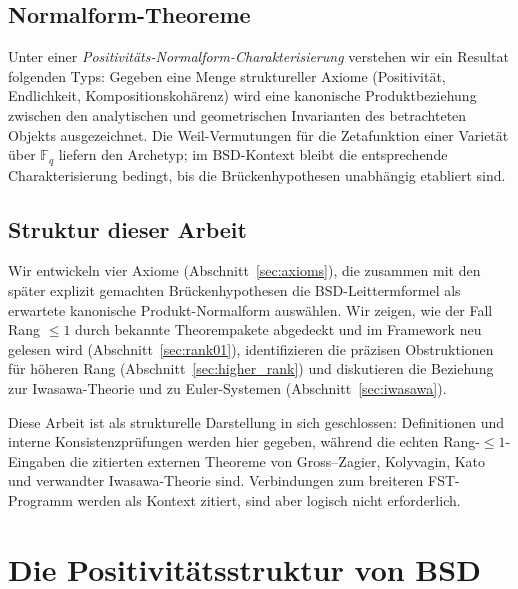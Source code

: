 \documentclass[aps,prd,twocolumn,superscriptaddress,nofootinbib,floatfix]{revtex4-2}
\theoremstyle{definition}
\theoremstyle{remark}
\begin{document}
\subsection{Normalform-Theoreme}

Unter einer \textit{Positivitäts-Normalform-Charakterisierung} verstehen wir ein Resultat folgenden Typs: Gegeben eine Menge struktureller Axiome (Positivität, Endlichkeit, Kompositionskohärenz) wird eine kanonische Produktbeziehung zwischen den analytischen und geometrischen Invarianten des betrachteten Objekts ausgezeichnet. Die Weil-Vermutungen für die Zetafunktion einer Varietät über $\mathbb{F}_q$ liefern den Archetyp; im BSD-Kontext bleibt die entsprechende Charakterisierung bedingt, bis die Brückenhypothesen unabhängig etabliert sind.

\subsection{Struktur dieser Arbeit}

Wir entwickeln vier Axiome (Abschnitt~\ref{sec:axioms}), die zusammen mit den später explizit gemachten Brückenhypothesen die BSD-Leittermformel als erwartete kanonische Produkt-Normalform auswählen. Wir zeigen, wie der Fall Rang $\leq 1$ durch bekannte Theorempakete abgedeckt und im Framework neu gelesen wird (Abschnitt~\ref{sec:rank01}), identifizieren die präzisen Obstruktionen für höheren Rang (Abschnitt~\ref{sec:higher_rank}) und diskutieren die Beziehung zur Iwasawa-Theorie und zu Euler-Systemen (Abschnitt~\ref{sec:iwasawa}).

Diese Arbeit ist als strukturelle Darstellung in sich geschlossen: Definitionen und interne Konsistenzprüfungen werden hier gegeben, während die echten Rang-$\leq 1$-Eingaben die zitierten externen Theoreme von Gross--Zagier, Kolyvagin, Kato und verwandter Iwasawa-Theorie sind. Verbindungen zum breiteren FST-Programm werden als Kontext zitiert, sind aber logisch nicht erforderlich.


\clearpage
\section{Die Positivitätsstruktur von BSD}
\label{sec:positivity}
\end{document}
